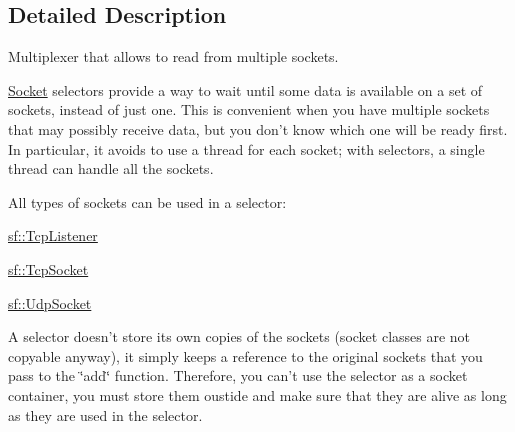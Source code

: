 \subsection{Detailed Description}
Multiplexer that allows to read from multiple sockets. 

\hyperlink{classsf_1_1_socket}{Socket} selectors provide a way to wait until some data is available on a set of sockets, instead of just one. This is convenient when you have multiple sockets that may possibly receive data, but you don't know which one will be ready first. In particular, it avoids to use a thread for each socket; with selectors, a single thread can handle all the sockets.

All types of sockets can be used in a selector\+: \begin{DoxyItemize}
\item \hyperlink{classsf_1_1_tcp_listener}{sf\+::\+Tcp\+Listener} \item \hyperlink{classsf_1_1_tcp_socket}{sf\+::\+Tcp\+Socket} \item \hyperlink{classsf_1_1_udp_socket}{sf\+::\+Udp\+Socket}\end{DoxyItemize}
A selector doesn't store its own copies of the sockets (socket classes are not copyable anyway), it simply keeps a reference to the original sockets that you pass to the \char`\"{}add\char`\"{} function. Therefore, you can't use the selector as a socket container, you must store them oustide and make sure that they are alive as long as they are used in the selector.

